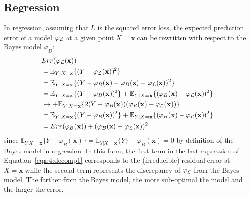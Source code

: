 \subsection{Regression}
\label{sec:bias-variance:regression}

In regression, assuming that $L$ is the squared error loss, the expected
prediction error of a model $\varphi_{\cal L}$ at a given point $X=\mathbf{x}$
can be rewritten with respect to the Bayes model $\varphi_B$:
\begin{align}
& Err(\varphi_{\cal L}(\mathbf{x})) \nonumber \\
&= \mathbb{E}_{Y|X=\mathbf{x}} \{ (Y - \varphi_{\cal L}(\mathbf{x}))^2 \} \nonumber \\
&= \mathbb{E}_{Y|X=\mathbf{x}} \{ (Y -\varphi_B(\mathbf{x}) + \varphi_B(\mathbf{x}) - \varphi_{\cal L}(\mathbf{x}))^2 \} \nonumber \\
&= \mathbb{E}_{Y|X=\mathbf{x}} \{ (Y -\varphi_B(\mathbf{x}))^2  \} + \mathbb{E}_{Y|X=\mathbf{x}} \{ (\varphi_B(\mathbf{x}) - \varphi_{\cal L}(\mathbf{x}))^2 \} \nonumber \\
& \hookrightarrow + \mathbb{E}_{Y|X=\mathbf{x}} \{ 2 (Y - \varphi_B(\mathbf{x}))(\varphi_B(\mathbf{x}) - \varphi_{\cal L}(\mathbf{x})) \} \nonumber \\
&= \mathbb{E}_{Y|X=\mathbf{x}} \{ (Y -\varphi_B(\mathbf{x}))^2 \} + \mathbb{E}_{Y|X=\mathbf{x}} \{ (\varphi_B(\mathbf{x}) - \varphi_{\cal L}(\mathbf{x}))^2 \} \nonumber \\
&= Err(\varphi_B(\mathbf{x})) +  (\varphi_B(\mathbf{x}) - \varphi_{\cal L}(\mathbf{x}))^2 \label{eqn:4:decomp1}
\end{align}
since $\mathbb{E}_{Y|X=\mathbf{x}} \{ Y - \varphi_B(\mathbf{x}) \} =
\mathbb{E}_{Y|X=\mathbf{x}} \{ Y \} - \varphi_B(\mathbf{x}) = 0$ by definition
of the Bayes model in regression. In this form, the first term in the last
expression of Equation~\ref{eqn:4:decomp1} corresponds to the (irreducible)
residual error  at $X=\mathbf{x}$ while the second term represents the
discrepancy of $\varphi_{\cal L}$ from the Bayes model. The farther from the
Bayes model, the more sub-optimal the model and the larger the error.

